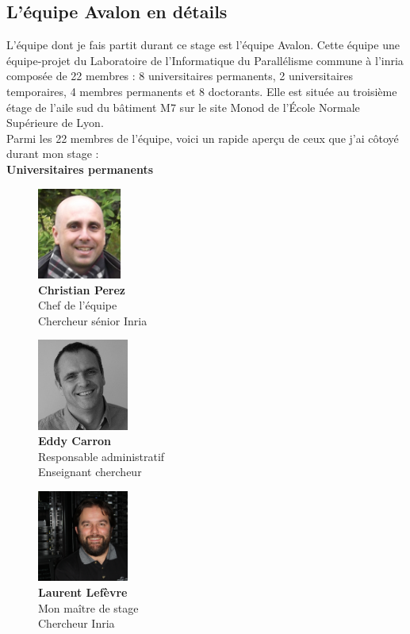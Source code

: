 \subsection{L'équipe Avalon en détails}
L'équipe dont je fais partit durant ce stage est l'équipe Avalon. Cette équipe une équipe-projet du Laboratoire de l'Informatique du Parallélisme commune à l'\gls{inria} composée de 22 membres : 8 universitaires permanents, 2 universitaires temporaires, 4 membres permanents et 8 doctorants. Elle est située au troisième étage de l'aile sud du bâtiment M7 sur le site Monod de l'École Normale Supérieure de Lyon.\\

Parmi les 22 membres de l'équipe, voici un rapide aperçu de ceux que j'ai côtoyé durant mon stage :\\

\textbf{Universitaires permanents}
\begin{figure}[h!]
   \begin{minipage}{0.33\textwidth}
		\centering
		\includegraphics[height=3cm]{partie1/images/christian.jpg}\\
		\textbf{Christian Perez}\\
		Chef de l'équipe\\Chercheur sénior Inria
	\end{minipage}\hfill
	\begin{minipage}{0.33\textwidth}
		\centering
		\includegraphics[width=3cm]{partie1/images/eddy.jpeg}\\
		\textbf{Eddy Carron}\\
		Responsable administratif\\Enseignant chercheur
	\end{minipage}\hfill
	\begin{minipage}{0.33\textwidth}
		\centering
		\includegraphics[width=3cm]{partie1/images/laurent.jpg}\\
		\textbf{Laurent Lefèvre}\\
		Mon maître de stage\\Chercheur Inria
	\end{minipage}
\end{figure}

